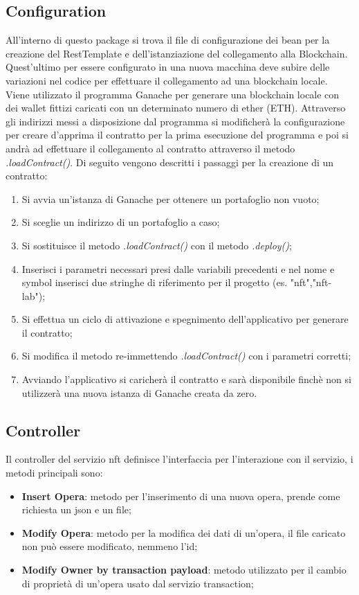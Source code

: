 \subsection{Configuration}
All'interno di questo package si trova il file di configurazione dei bean per la creazione del RestTemplate e dell'istanziazione del collegamento alla Blockchain. Quest'ultimo per essere configurato in una nuova macchina deve subire delle variazioni nel codice per effettuare il collegamento ad una blockchain locale. Viene utilizzato il programma Ganache per generare una blockchain locale con dei wallet fittizi caricati con un determinato numero di ether (ETH). Attraverso gli indirizzi messi a disposizione dal programma si modificherà la configurazione per creare d'apprima il contratto per la prima esecuzione del programma e poi si andrà ad effettuare il collegamento al contratto attraverso il metodo \emph{.loadContract()}.
Di seguito vengono descritti i passaggi per la creazione di un contratto:
\begin{enumerate}
	\item Si avvia un'istanza di Ganache per ottenere un portafoglio non vuoto;
	\item Si sceglie un indirizzo di un portafoglio a caso;
	\item Si sostituisce il metodo \emph{.loadContract()} con il metodo \emph{.deploy()};
	\item Inserisci i parametri necessari presi dalle variabili precedenti e nel nome e symbol inserisci due stringhe di riferimento per il progetto (es. "nft","nft-lab");
	\item Si effettua un ciclo di attivazione e spegnimento dell'applicativo per generare il contratto;
	\item Si modifica il metodo re-immettendo \emph{.loadContract()} con i parametri corretti;
	\item Avviando l'applicativo si caricherà il contratto e sarà disponibile finchè non si utilizzerà una nuova istanza di Ganache creata da zero.
\end{enumerate}
\subsection{Controller}
Il controller del servizio nft definisce l'interfaccia per l'interazione con il servizio, i metodi principali sono:
\begin{itemize}
	\item \textbf{Insert Opera}: metodo per l'inserimento di una nuova opera, prende come richiesta un json e un file;
	\item \textbf{Modify Opera}: metodo per la modifica dei dati di un'opera, il file caricato non può essere modificato, nemmeno l'id;
	\item \textbf{Modify Owner by transaction payload}: metodo utilizzato per il cambio di proprietà di un'opera usato dal servizio transaction;
\end{itemize}

